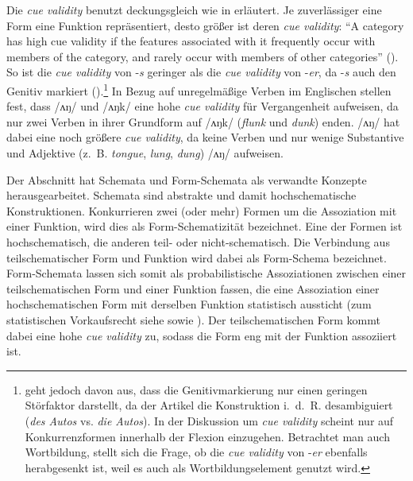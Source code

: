  
\begin{sloppypar}
Die \textit{cue validity} benutzt \textcite[82]{Kopcke.1993} deckungsgleich wie in  erläutert. Je zuverlässiger eine Form eine Funktion repräsentiert, desto größer ist deren \textit{cue validity}: "`A category has high cue validity if the features associated with it frequently occur with members of the category, and rarely occur with members of other categories"' (\cite[266]{Bybee.1983}). So ist die \textit{cue validity} von -\textit{s} geringer als die \textit{cue validity} von -\textit{er}, da -\textit{s} auch den Genitiv markiert (\cite[82--83]{Kopcke.1993}).\footnote{\textcite[83]{Kopcke.1993} geht jedoch davon aus, dass die Genitivmarkierung nur einen geringen Störfaktor darstellt, da der Artikel die Konstruktion i.~d.~R. desambiguiert (\textit{des Autos} vs. \textit{die Autos}). In der Diskussion um \textit{cue validity} scheint \textcite{Kopcke.1993} nur auf Konkurrenzformen innerhalb der Flexion einzugehen. Betrachtet man auch Wortbildung, stellt sich die Frage, ob die \textit{cue validity} von -\textit{er} ebenfalls herabgesenkt ist, weil es auch als Wortbildungselement genutzt wird.}  In Bezug auf unregelmäßige Verben im Englischen stellen \textcite[266]{Bybee.1983} fest, dass /ʌŋ/ und /ʌŋk/ eine hohe \textit{cue validity} für Vergangenheit aufweisen, da nur zwei Verben in ihrer Grundform auf /ʌŋk/ (\textit{flunk} und \textit{dunk}) enden. /ʌŋ/ hat dabei eine noch größere \textit{cue validity}, da keine Verben und nur wenige Substantive und Adjektive  (z.~B. \textit{tongue}, \textit{lung}, \textit{dung}) /ʌŋ/ aufweisen. 
\end{sloppypar}

Der Abschnitt hat Schemata und Form-Schemata als verwandte Konzepte herausgearbeitet. Schemata sind abstrakte und damit hochschematische Konstruktionen. Konkurrieren zwei (oder mehr) Formen um die Assoziation mit einer Funktion, wird dies als Form-Schematizität bezeichnet. Eine der Formen ist hochschematisch, die anderen teil- oder nicht-schematisch. Die Verbindung aus teilschematischer Form und Funktion wird dabei als Form-Schema bezeichnet. Form-Schemata lassen sich somit als probabilistische Assoziationen zwischen einer teilschematischen Form und einer Funktion fassen, die eine Assoziation einer hochschematischen Form mit derselben Funktion statistisch aussticht (zum statistischen Vorkaufsrecht siehe \cite[74--94]{Goldberg.2019} sowie ). Der teilschematischen Form kommt dabei eine hohe \textit{cue validity} zu, sodass die Form eng mit der Funktion assoziiert ist.


